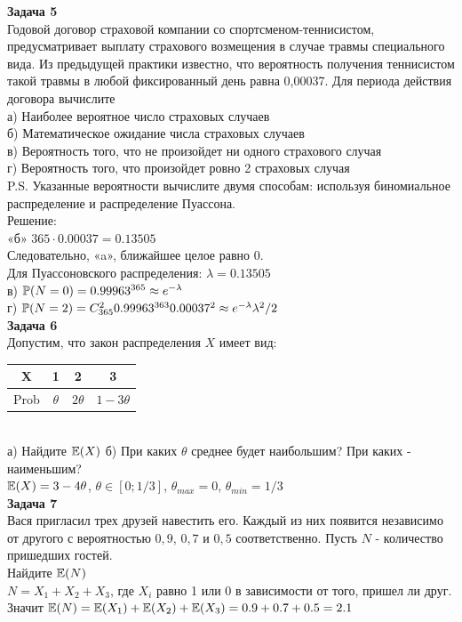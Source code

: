 \documentclass[12pt, a4paper]{article}\usepackage[]{graphicx}\usepackage[]{color}
\begin{document}
\textbf{Задача 5} \\ %
Годовой договор страховой компании со спортсменом-теннисистом, предусматривает выплату страхового возмещения  в случае травмы специального вида. Из предыдущей практики известно, что вероятность получения теннисистом такой травмы  в любой фиксированный день равна 0,00037. Для периода действия договора вычислите \\
а) Наиболее вероятное число страховых случаев  \\
б) Математическое ожидание числа страховых случаев \\
в) Вероятность того, что не произойдет ни одного страхового случая \\
г) Вероятность того, что произойдет ровно 2 страховых случая \\
P.S. Указанные вероятности вычислите двумя способам: используя биномиальное распределение и распределение Пуассона.\\
Решение: \\
«б» $365\cdot 0.00037=0.13505$ \\
Следовательно, «a», ближайшее целое равно 0. \\
Для Пуассоновского распределения: $\lambda=0.13505$ \\
в) $\P(N=0)=0.99963^{365}\approx e^{-\lambda}$ \\
г) $\P(N=2)=C_{365}^{2}0.99963^{363}0.00037^{2}\approx e^{-\lambda}\lambda^{2}/2$ \\


\textbf{Задача 6} \\ %
Допустим, что закон распределения $X$ имеет вид:
\begin{tabular}{c|ccc}
  X & 1 & 2 & 3 \\
  \hline
  Prob & $\theta$ & $2\theta$ & $1-3\theta$ \\
\end{tabular} \\
а) Найдите $\E(X)$ %
б) При каких $\theta$ среднее будет наибольшим? При каких - наименьшим? \\
$\E(X)=3-4\theta$, $\theta\in[0;1/3]$, $\theta_{max}=0$, $\theta_{min}=1/3$ \\


\textbf{Задача 7} \\ %
Вася пригласил трех друзей навестить его. Каждый из них появится
независимо от другого с вероятностью $0,9$, $0,7$ и $0,5$
соответственно. Пусть $N$ - количество пришедших гостей. \\
Найдите $\E(N)$ \\
$N=X_{1}+X_{2}+X_{3}$, где $X_{i}$ равно 1 или 0 в зависимости от того, пришел ли друг. Значит $\E(N)=\E(X_{1})+\E(X_{2})+\E(X_{3})=0.9+0.7+0.5=2.1$ \\
\end{document}
